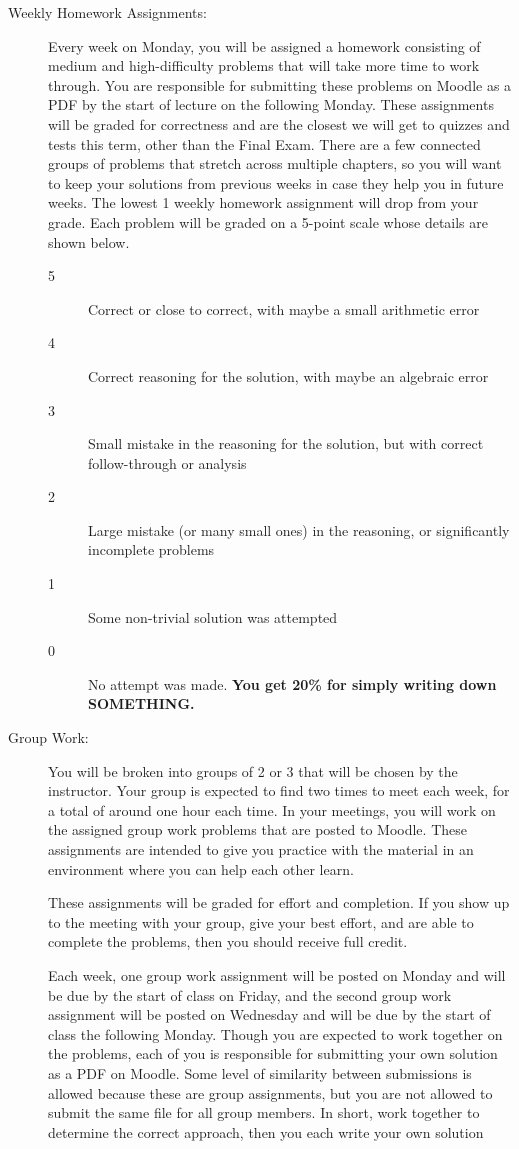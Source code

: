 \documentclass[12pt]{article}
\begin{document}
\begin{description}
\item[Weekly Homework Assignments:] Every week on Monday, you will be assigned a homework consisting of medium and high-difficulty problems that will take more time to work through. You are responsible for submitting these problems on Moodle as a PDF by the start of lecture on the following Monday. These assignments will be graded for correctness and are the closest we will get to quizzes and tests this term, other than the Final Exam. There are a few connected groups of problems that stretch across multiple chapters, so you will want to keep your solutions from previous weeks in case they help you in future weeks. The lowest 1 weekly homework assignment will drop from your grade. Each problem will be graded on a 5-point scale whose details are shown below.

  \begin{description}
  \item[5] Correct or close to correct, with maybe a small arithmetic error
  \item[4] Correct reasoning for the solution, with maybe an algebraic error
  \item[3] Small mistake in the reasoning for the solution, but with correct follow-through or analysis
  \item[2] Large mistake (or many small ones) in the reasoning, or significantly incomplete problems
  \item[1] Some non-trivial solution was attempted
    \item[0] No attempt was made. \textbf{You get 20\% for simply writing down SOMETHING.}
    \end{description}

  \item[Group Work:] You will be broken into groups of 2 or 3 that will be chosen by the instructor. Your group is expected to find two times to meet each week, for a total of around one hour each time. In your meetings, you will work on the assigned group work problems that are posted to Moodle. These assignments are intended to give you practice with the material in an environment where you can help each other learn.

    These assignments will be graded for effort and completion. If you show up to the meeting with your group, give your best effort, and are able to complete the problems, then you should receive full credit.

    Each week, one group work assignment will be posted on Monday and will be due by the start of class on Friday, and the second group work assignment will be posted on Wednesday and will be due by the start of class the following Monday. Though you are expected to work together on the problems, each of you is responsible for submitting your own solution as a PDF on Moodle. Some level of similarity between submissions is allowed because these are group assignments, but you are not allowed to submit the same file for all group members. In short, work together to determine the correct approach, then you each write your own solution


\end{description}
\end{document}
